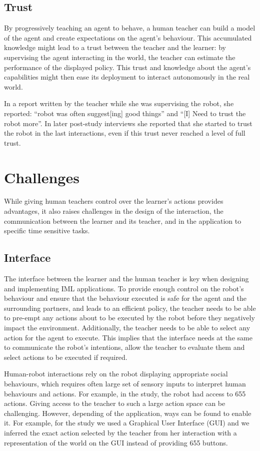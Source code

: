 \documentclass[letterpaper, 10 pt, conference]{ieeeconf}  %
\begin{document}
\subsection{Trust}
By progressively teaching an agent to behave, a human teacher can build a model of the agent and create expectations on the agent's behaviour. This accumulated knowledge might lead to a trust between the teacher and the learner: by supervising the agent interacting in the world, the teacher can estimate the performance of the displayed policy. This trust and knowledge about the agent's capabilities might then ease its deployment to interact autonomously in the real world.

In a report written by the teacher while she was supervising the robot, she reported: ``robot was often suggest[ing] good things'' and ``[I] Need to trust the robot more''. In later post-study  interviews she reported that she started to trust the robot in the last interactions, even if this trust never reached a level of full trust. 

\section{Challenges}
While giving human teachers control over the learner's actions provides advantages, it also raises challenges in the design of the interaction, the communication between the learner and its teacher, and in the application to specific time sensitive tasks.
    
\subsection{Interface}
The interface between the learner and the human teacher is key when designing and implementing IML applications. To provide enough control on the robot's behaviour and ensure that the behaviour executed is safe for the agent and the surrounding partners, and leads to an efficient policy, the teacher needs to be able to pre-empt any actions about to be executed by the robot before they negatively impact the environment. Additionally, the teacher needs to be able to select any action for the agent to execute. This implies that the interface needs at the same to communicate the robot's intentions, allow the teacher to evaluate them and select actions to be executed if required.

Human-robot interactions rely on the robot displaying appropriate social behaviours, which requires often large set of sensory inputs to interpret human behaviours and actions. For example, in the study, the robot had access to 655 actions. Giving access to the teacher to such a large action space can be challenging. However, depending of the application, ways can be found to enable it. For example, for the study we used a Graphical User Interface (GUI) and we inferred the exact action selected by the teacher from her interaction with a representation of the world on the GUI instead of providing 655 buttons.
\end{document}
